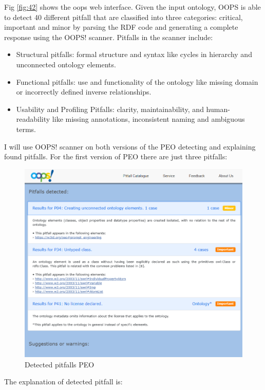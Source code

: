 Fig \ref{fig:42} shows the oops web interface.
Given the input ontology, OOPS is able to detect 40 different pitfall that are classified into three categories: critical, important and minor by parsing the RDF code and generating a complete response using the OOPS! scanner. Pitfalls in the scanner include:
\begin{itemize}
    \item Structural pitfalls: formal structure and syntax like cycles in hierarchy and unconnected ontology elements.

    \item Functional pitfalls: use and functionality of the ontology like missing domain or incorrectly defined inverse relationships.

    \item Usability and Profiling Pitfalls: clarity, maintainability, and human-readability like missing annotations, inconsistent naming and ambiguous terms.
\end{itemize}
I will use OOPS! scanner on both versions of the PEO detecting and explaining found pitfalls. 
For the first version of PEO there are just three pitfalls:
\begin{figure}[H]
    \centering
    \includegraphics[width=0.9\linewidth]{Figures/fig_43.png}
    \caption{Detected pitfalls PEO}
    \label{fig:enter-label}
\end{figure}
The explanation of detected pitfall is:
